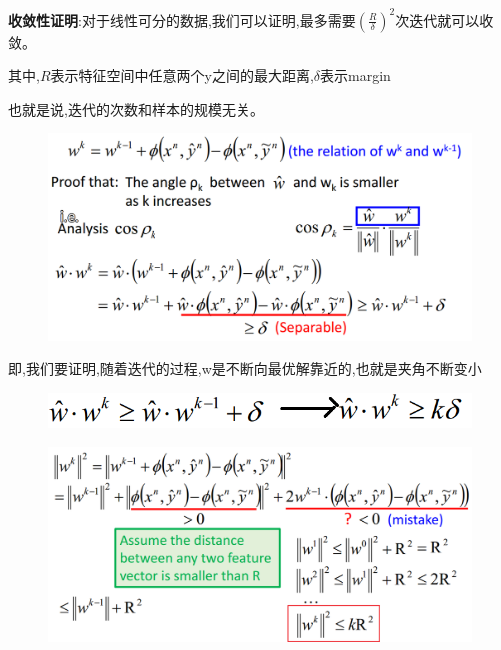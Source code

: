 \documentclass[UTF8,a4paper]{ctexart}
\begin{document}
        \textbf{收敛性证明}:对于线性可分的数据,我们可以证明,最多需要$(\frac{R}{\delta})^2$次迭代就可以收敛。

        其中,$R$表示特征空间中任意两个y之间的最大距离,$\delta$表示margin

        也就是说,迭代的次数和样本的规模无关。

        \begin{figure}[H]
            \centering
            \includegraphics[scale = 0.3]{assets/ML_178a9.png}
        \end{figure}
        即,我们要证明,随着迭代的过程,w是不断向最优解靠近的,也就是夹角不断变小

        \begin{figure}[H]
            \centering
            \includegraphics[scale = 0.3]{assets/ML_85362.png}
        \end{figure}


        \begin{figure}[H]
            \centering
            \includegraphics[scale = 0.3]{assets/ML_2532d.png}
        \end{figure}
\end{document}
